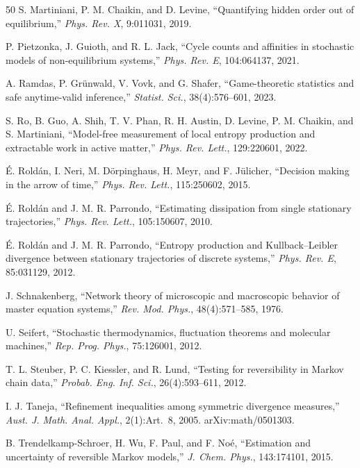\documentclass[11pt]{article}
\theoremstyle{definition}
\theoremstyle{remark}
\begin{document}
\begin{thebibliography}{50}
S. Martiniani, P. M. Chaikin, and D. Levine, ``Quantifying hidden order out of equilibrium,'' \emph{Phys. Rev. X}, 9:011031, 2019.

P. Pietzonka, J. Guioth, and R. L. Jack, ``Cycle counts and affinities in stochastic models of non-equilibrium systems,'' \emph{Phys. Rev. E}, 104:064137, 2021.

A. Ramdas, P. Gr\"unwald, V. Vovk, and G. Shafer, ``Game-theoretic statistics and safe anytime-valid inference,'' \emph{Statist. Sci.}, 38(4):576--601, 2023.

S. Ro, B. Guo, A. Shih, T. V. Phan, R. H. Austin, D. Levine, P. M. Chaikin, and S. Martiniani, ``Model-free measurement of local entropy production and extractable work in active matter,'' \emph{Phys. Rev. Lett.}, 129:220601, 2022.

\'E. Rold\'an, I. Neri, M. D\"orpinghaus, H. Meyr, and F. J\"ulicher, ``Decision making in the arrow of time,'' \emph{Phys. Rev. Lett.}, 115:250602, 2015.

\'E. Rold\'an and J. M. R. Parrondo, ``Estimating dissipation from single stationary trajectories,'' \emph{Phys. Rev. Lett.}, 105:150607, 2010.

\'E. Rold\'an and J. M. R. Parrondo, ``Entropy production and Kullback--Leibler divergence between stationary trajectories of discrete systems,'' \emph{Phys. Rev. E}, 85:031129, 2012.

J. Schnakenberg, ``Network theory of microscopic and macroscopic behavior of master equation systems,'' \emph{Rev. Mod. Phys.}, 48(4):571--585, 1976.

U. Seifert, ``Stochastic thermodynamics, fluctuation theorems and molecular machines,'' \emph{Rep. Prog. Phys.}, 75:126001, 2012.

T. L. Steuber, P. C. Kiessler, and R. Lund, ``Testing for reversibility in Markov chain data,'' \emph{Probab. Eng. Inf. Sci.}, 26(4):593--611, 2012.

I. J. Taneja, ``Refinement inequalities among symmetric divergence measures,'' \emph{Aust. J. Math. Anal. Appl.}, 2(1):Art.~8, 2005. arXiv:math/0501303.

B. Trendelkamp-Schroer, H. Wu, F. Paul, and F. No\'e, ``Estimation and uncertainty of reversible Markov models,'' \emph{J. Chem. Phys.}, 143:174101, 2015.


\end{thebibliography}
\end{document}
